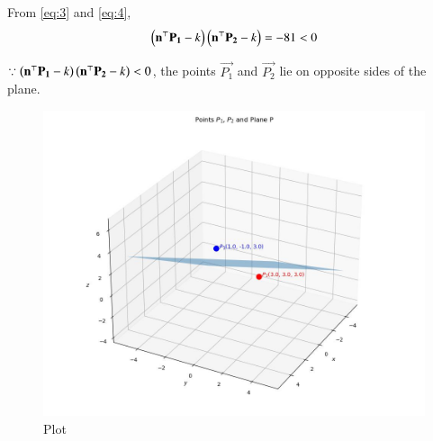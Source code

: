 \documentclass[journal]{IEEEtran}
\begin{document}
From \eqref{eq:3} and \eqref{eq:4}, 
\begin{align}
    \left(\mathbf{n}^\top\mathbf{P_1}-k\right)\left(\mathbf{n}^\top\mathbf{P_2}-k\right) = -81 < 0
\end{align}

$\because \left(\mathbf{n}^\top\mathbf{P_1}-k\right)\left(\mathbf{n}^\top\mathbf{P_2}-k\right) < 0$, the points $\vec{P_1}$ and $\vec{P_2}$ lie on opposite sides of the plane.

\begin{figure}
    \centering
    \includegraphics[width=\columnwidth]{figs/plot_c.jpg}
    \caption*{Plot}
    \label{fig:fig}
\end{figure}
\end{document}
